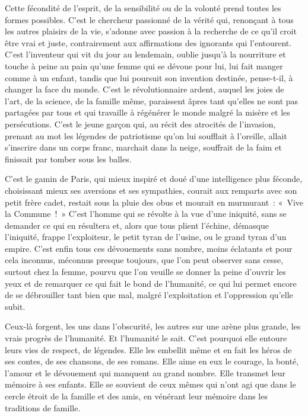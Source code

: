 \documentclass[french,twoside]{book} %
\begin{document}
Cette fécondité de l’esprit, de la sensibilité ou de la volonté prend toutes les formes possibles. C’est le chercheur passionné de la vérité qui, renonçant à tous les autres plaisirs de la vie, s’adonne avec passion à la recherche de ce qu’il croit être vrai et juste, contrairement aux affirmations des ignorants qui l’entourent. C’est l’inventeur qui vit du jour au lendemain, oublie jusqu’à la nourriture et touche à peine au pain qu’une femme qui se dévoue pour lui, lui fait manger comme à un enfant, tandis que lui poursuit son invention destinée, pense-t-il, à changer la face du monde. C’est le révolutionnaire ardent, auquel les joies de l’art, de la science, de la famille même, paraissent âpres tant qu’elles ne sont pas partagées par tous et qui travaille à régénérer le monde malgré la misère et les persécutions. C’est le jeune garçon qui, au récit des atrocités de l’invasion, prenant au mot les légendes de patriotisme qu’on lui soufflait à l’oreille, allait s’inscrire dans un corps franc, marchait dans la neige, souffrait de la faim et finissait par tomber sous les balles.\par
C’est le gamin de Paris, qui mieux inspiré et doué d’une intelligence plus féconde, choisissant mieux ses aversions et ses sympathies, courait aux remparts avec son petit frère cadet, restait sous la pluie des obus et mourait en murmurant : « Vive la Commune ! » C’est l’homme qui se révolte à la vue d’une iniquité, sans se demander ce qui en résultera et, alors que tous plient l’échine, démasque l’iniquité, frappe l’exploiteur, le petit tyran de l’usine, ou le grand tyran d’un empire. C’est enfin tous ces dévouements sans nombre, moins éclatants et pour cela inconnus, méconnus presque toujours, que l’on peut observer sans cesse, surtout chez la femme, pourvu que l’on veuille se donner la peine d’ouvrir les yeux et de remarquer ce qui fait le bond de l’humanité, ce qui lui permet encore de se débrouiller tant bien que mal, malgré l’exploitation et l’oppression qu’elle subit.\par
\bigbreak
\noindent Ceux-là forgent, les uns dans l’obscurité, les autres sur une arène plus grande, les vrais progrès de l’humanité. Et l’humanité le sait. C’est pourquoi elle entoure leurs vies de respect, de légendes. Elle les embellit même et en fait les héros de ses contes, de ses chansons, de ses romans. Elle aime en eux le courage, la bonté, l’amour et le dévouement qui manquent au grand nombre. Elle transmet leur mémoire à  ses enfants. Elle se souvient de ceux mêmes qui n’ont agi que dans le cercle étroit de la famille et des amis, en vénérant leur mémoire dans les traditions de famille.\par
\end{document}
